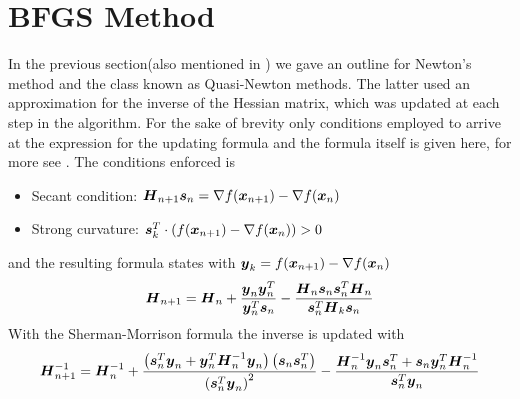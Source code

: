 \section{BFGS Method\label{sec:BFGS}}
    In the previous section(also mentioned in ) we gave an
    outline for Newton's method and the class known as Quasi-Newton methods.
    The latter used an approximation for the inverse of the Hessian matrix,
    which was updated at each step in the algorithm. For the sake of brevity
    only conditions employed to arrive at the expression for the updating
    formula and the formula itself is given here, for more see \cite{BFGSB,
    BFGSF, BFGSG, BFGSS, numOptNocWrig}. The conditions enforced is
        \begin{itemize}
            \item Secant condition: $\boldsymbol{{H}}_{n+1} \boldsymbol{{s}}_n = \nabla
                f(\boldsymbol{{x}}_{n+1}) - \nabla f(\boldsymbol{{x}}_n)$
            \item Strong curvature: $\boldsymbol{{s}}^T_k\cdot (f(\boldsymbol{{x}}_{n+1}) -
                \nabla f(\boldsymbol{{x}}_n)) > 0$
        \end{itemize}
    and the resulting formula states with $\boldsymbol{{y}}_k = f(\boldsymbol{{x}}_{n+1}) -
    \nabla f(\boldsymbol{{x}}_n)$
        \begin{equation}
            \boldsymbol{{H}}_{n+1} = \boldsymbol{{H}}_n +
            \frac{\boldsymbol{{y}}_n\boldsymbol{{y}}^T_n}{\boldsymbol{{y}}^T_n \boldsymbol{{s}}_n} -
            \frac{\boldsymbol{{H}}_n\boldsymbol{{s}}_n\boldsymbol{{s}}^T_n\boldsymbol{{H}}_n}
            {\boldsymbol{{s}}^T_n\boldsymbol{{H}}_k\boldsymbol{{s}}_n}
            \label{eq:BFGSdef}
        \end{equation}
    With the Sherman-Morrison formula\cite{shermorInv} the inverse is updated
    with
        \begin{equation}
            \boldsymbol{{H}}^{-1}_{n+1} = \boldsymbol{{H}}^{-1}_n +
            \frac{\left(\boldsymbol{{s}}^T_n\boldsymbol{{y}}_n +
            \boldsymbol{{y}}^T_n\boldsymbol{{H}}^{-1}_n\boldsymbol{{y}}_n\right)
            \left(\boldsymbol{{s}}_n\boldsymbol{{s}}^T_n\right)}
            {\left(\boldsymbol{{s}}^T_n\boldsymbol{{y}}_n\right)^2} -
            \frac{\boldsymbol{{H}}^{-1}_n\boldsymbol{{y}}_n\boldsymbol{{s}}^T_n +
            \boldsymbol{{s}}_n\boldsymbol{{y}}^T_n\boldsymbol{{H}}^{-1}_n}{\boldsymbol{{s}}^T_n\boldsymbol{{y}}_n}
            \label{eq:shermanmorrisondef}
        \end{equation}

